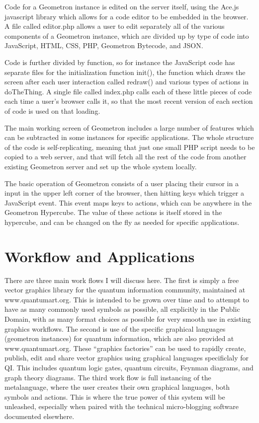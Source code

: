 \documentclass[11pt]{article}
\begin{document}
    Code for a Geometron instance is edited on the server itself, using the Ace.js javascript library which allows for a code editor to be embedded in the browser.   A file called editor.php allows a user to edit separately all of the various components of a Geometron instance, which are divided up by type of code into JavaScript, HTML, CSS, PHP, Geometron Bytecode, and JSON.  

    Code is further divided by function, so for instance the JavaScript code has separate files for the initialization function init(), the function which draws the screen after each user interaction called redraw() and various types of actions in doTheThing.  A single file called index.php calls each of these little pieces of code each time a user's browser calls it, so that the most recent version of each section of code is used on that loading.  

    The main working screen of Geometron includes a large number of features which can be subtracted in some instances for specific applications.  The whole structure of the code is self-replicating, meaning that just one small PHP script needs to be copied to a web server, and that will fetch all the rest of the code from another existing Geometron server and set up the whole system locally.  

    The basic operation of Geometron consists of a user placing their cursor in a input in the upper left corner of the browser, then hitting keys which trigger a JavaScript event.  This event maps keys to actions, which can be anywhere in the Geometron Hypercube.  The value of these actions is itself stored in the hypercube, and can be changed on the fly as needed for specific applications.


\section{Workflow and Applications}

    There are three main work flows I will discuss here.  The first is simply a free vector graphics library for the quantum information community, maintained at www.quantumart.org.  This is intended to be grown over time and to attempt to have as many commonly used symbols as possible, all explicitly in the Public Domain, with as many format choices as possible for very smooth use in existing graphics workflows.  The second is use of the specific graphical languages (geometron instances) for quantum information, which are also provided at www.quantumart.org.  These ``graphics factories'' can be used to rapidly create, publish, edit and share vector graphics using graphical languages specificlaly for QI.  This includes quantum logic gates, quantum circuits, Feynman diagrams, and graph theory diagrams. The third work flow is full instancing of the metalanguage, where the user creates their own graphical languages, both symbols and actions.  This is where the true power of this system will be unleashed, especially when paired with the technical micro-blogging software documented elsewhere.  
\end{document}
